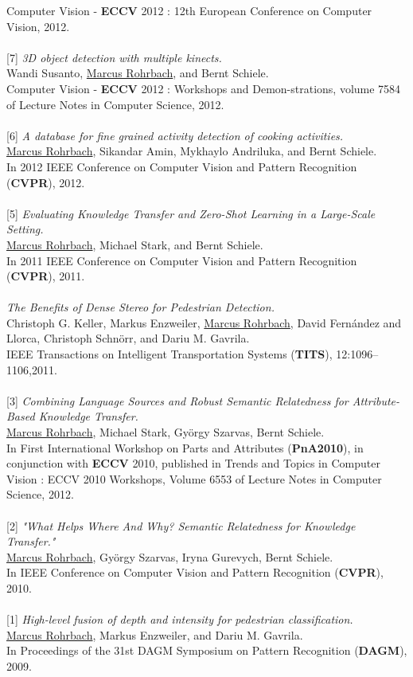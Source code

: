 Computer Vision - \textbf{ECCV} 2012 : 12th European Conference on Computer Vision, 2012.
\\
\\
{[7]} \textit{3D object detection with multiple kinects.}\\
Wandi Susanto, \ul{Marcus Rohrbach}, and Bernt Schiele.  \\
Computer Vision - \textbf{ECCV} 2012 : Workshops and Demon-strations, volume 7584 of Lecture Notes in Computer Science, 2012.
\\
\\
{[6]} \textit{A database for fine grained activity detection of cooking activities.}\\
\ul{Marcus Rohrbach}, Sikandar Amin, Mykhaylo Andriluka, and Bernt Schiele.\\
In 2012 IEEE Conference on Computer Vision and Pattern Recognition (\textbf{CVPR}), 2012.
\\
\\
{[5]} \textit{Evaluating Knowledge Transfer and Zero-Shot Learning in a Large-Scale Setting.}\\
\ul{Marcus Rohrbach}, Michael Stark, and Bernt Schiele.\\  
In 2011 IEEE Conference on Computer Vision and Pattern Recognition (\textbf{CVPR}), 2011.
\\
\\\newpage
\noindent{[4]} \textit{The Benefits of Dense Stereo for Pedestrian Detection.}\\
Christoph G. Keller, Markus Enzweiler, \ul{Marcus Rohrbach}, David Fern{\'a}ndez and Llorca, Christoph Schn{\"o}rr, and Dariu M. Gavrila.\\
IEEE Transactions on Intelligent Transportation Systems (\textbf{TITS}), 12:1096--1106,2011.
\\
\\
{[3]} \textit{Combining Language Sources and Robust Semantic Relatedness for Attribute-Based Knowledge Transfer.} \\
\ul{Marcus Rohrbach}, Michael Stark, Gy{\"o}rgy Szarvas, Bernt Schiele.\\
In First International Workshop on Parts and Attributes ({\bf PnA2010}), in
conjunction with {\bf ECCV} 2010, published in Trends and
Topics in Computer Vision : ECCV 2010 Workshops, Volume 6553 of Lecture Notes in Computer Science, 2012.
\\
\\
{[2]} \textit{"What Helps Where {\textendash} And Why? Semantic Relatedness for Knowledge Transfer."} \\
\ul{Marcus Rohrbach}, Gy{\"o}rgy Szarvas, Iryna Gurevych, Bernt Schiele.\\
In IEEE Conference on Computer Vision and Pattern Recognition ({\bf CVPR}), 2010.
\\
\\
{[1]} \textit{High-level fusion of depth and intensity for pedestrian classification.}\\
\ul{Marcus Rohrbach}, Markus Enzweiler, and Dariu M. Gavrila.\\
In Proceedings of the 31st DAGM Symposium on Pattern Recognition (\textbf{DAGM}), 2009.